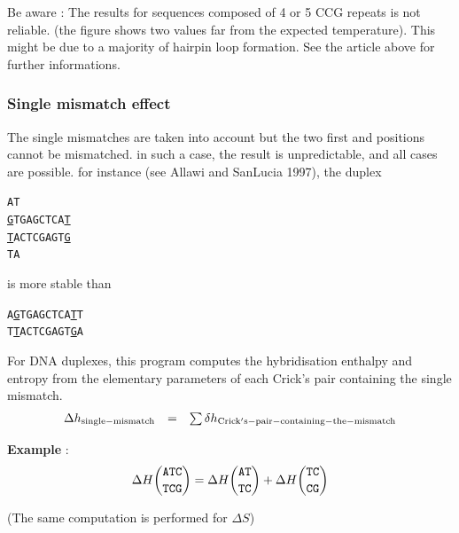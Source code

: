 \documentclass{article}
\begin{document}
\pagebreak
Be aware : The results for sequences composed of 4 or 5 CCG repeats is not reliable. (the figure shows two values
far from the expected temperature). This might be due to a majority of hairpin loop formation. See the article
above for further informations.

\subsubsection{Single mismatch effect}

The single mismatches are taken into account but the two first and positions cannot
be mismatched. in such a case, the result is unpredictable, and all cases are
possible. for instance (see Allawi and SanLucia 1997), the duplex
\begin{alltt}
A          T  
 \underline{G}TGAGCTCA\underline{T}  
 \underline{T}ACTCGAGT\underline{G}  
T          A   
\end{alltt}

is more stable than 

\begin{alltt}
A\underline{G}TGAGCTCA\underline{T}T 
T\underline{T}ACTCGAGT\underline{G}A 
\end{alltt}

For DNA duplexes, this program computes the hybridisation enthalpy and entropy from the elementary 
parameters of each Crick's pair containing the single mismatch. 
\begin{displaymath}
  \begin{array}[t]{ccc}
  \Delta{}h_\mathrm{single-mismatch}&=&\sum \delta{}h_\mathrm{Crick's-pair-containing-the-mismatch}\\
  \end{array}
\end{displaymath}

\textbf{Example} :
\begin{multline*}
\Delta H {\mbox{\texttt{ATC}} \choose \mbox{\texttt{TCG}}} = 
\Delta H {\mbox{\texttt{AT}} \choose \mbox{\texttt{TC}} } + 
\Delta H {\mbox{\texttt{TC}} \choose \mbox{\texttt{CG}} } \\
\end{multline*}

       (The same computation is performed for $\Delta S$)
       
\end{document}
